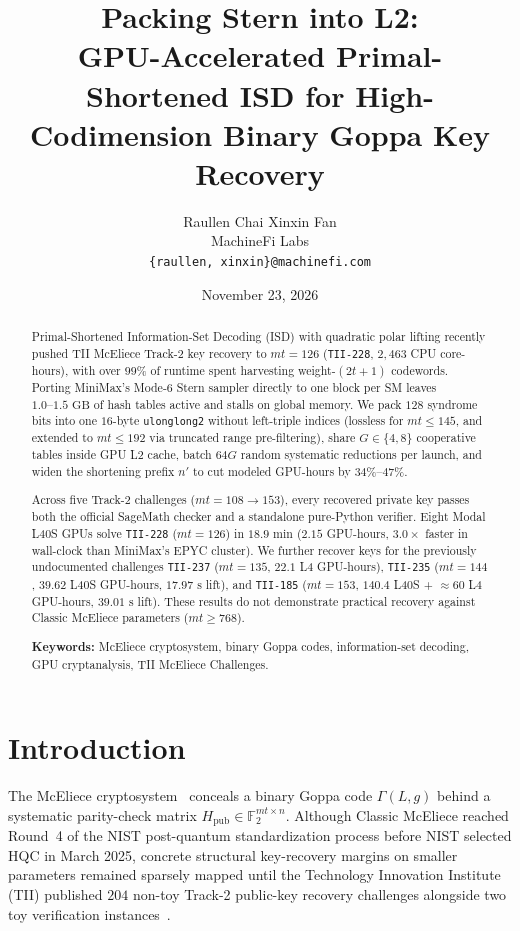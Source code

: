 \documentclass[11pt,a4paper]{article}
\title{\textbf{Packing Stern into L2:}\\
GPU-Accelerated Primal-Shortened ISD for High-Codimension Binary Goppa Key Recovery}
\author{Raullen Chai \qquad Xinxin Fan\\[3pt]
\small MachineFi Labs\\
\small \texttt{\{raullen, xinxin\}@machinefi.com}}
\date{November 23, 2026}
\begin{document}
\maketitle

\begin{abstract}
Primal-Shortened Information-Set Decoding (ISD) with quadratic polar lifting recently pushed TII McEliece Track-2 key recovery to $mt=126$ (\texttt{TII-228}, $2{,}463$ CPU core-hours), with over $99\%$ of runtime spent harvesting weight-$(2t+1)$ codewords. Porting MiniMax's Mode-6 Stern sampler directly to one block per SM leaves $1.0\text{--}1.5\text{ GB}$ of hash tables active and stalls on global memory. We pack $128$ syndrome bits into one $16$-byte \texttt{ulonglong2} without left-triple indices (lossless for $mt \le 145$, and extended to $mt \le 192$ via truncated range pre-filtering), share $G \in \{4, 8\}$ cooperative tables inside GPU L2 cache, batch $64G$ random systematic reductions per launch, and widen the shortening prefix $n'$ to cut modeled GPU-hours by $34\%\text{--}47\%$.

Across five Track-2 challenges ($mt = 108 \to 153$), every recovered private key passes both the official SageMath checker and a standalone pure-Python verifier. Eight Modal L40S GPUs solve \texttt{TII-228} ($mt=126$) in $18.9\text{ min}$ ($2.15$ GPU-hours, $3.0\times$ faster in wall-clock than MiniMax's EPYC cluster). We further recover keys for the previously undocumented challenges \texttt{TII-237} ($mt=135$, $22.1$ L4 GPU-hours), \texttt{TII-235} ($mt=144$, $39.62$ L40S GPU-hours, $17.97\text{ s}$ lift), and \texttt{TII-185} ($mt=153$, $140.4$ L40S + $\approx 60$ L4 GPU-hours, $39.01\text{ s}$ lift). These results do not demonstrate practical recovery against Classic McEliece parameters ($mt \ge 768$).

\medskip
\noindent\textbf{Keywords:} McEliece cryptosystem, binary Goppa codes, information-set decoding, GPU cryptanalysis, TII McEliece Challenges.
\end{abstract}

\section{Introduction}

The McEliece cryptosystem~\cite{McEliece78} conceals a binary Goppa code $\Gamma(L, g)$ behind a systematic parity-check matrix $H_{\mathrm{pub}} \in \mathbb{F}_2^{mt \times n}$. Although Classic McEliece reached Round~4 of the NIST post-quantum standardization process before NIST selected HQC in March 2025, concrete structural key-recovery margins on smaller parameters remained sparsely mapped until the Technology Innovation Institute (TII) published $204$ non-toy Track-2 public-key recovery challenges alongside two toy verification instances~\cite{TIIRepo}.
\end{document}
